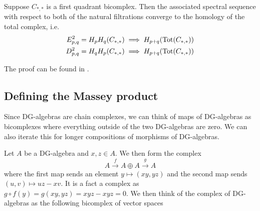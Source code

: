 \begin{lemma}
Suppose $C_{*,*}$ is a first quadrant bicomplex. %
Then the associated spectral sequence with respect to both of the natural filtrations converge to the homology of the total complex, i.e.
\begin{align*}
    E^2_{p,q} = H_p H_q (C_{*,*}) &\implies H_{p+q}(\operatorname{Tot}(C_{*,*})) \\
    D^2_{p,q} = H_q H_p (C_{*,*}) &\implies H_{p+q}(\operatorname{Tot}(C_{*,*}))
\end{align*}
\end{lemma}
The proof can be found in \cite[Theorem 5.5.1]{weibel}. 


\subsection*{Defining the Massey product}

Since DG-algebras are chain complexes, we can think of maps of DG-algebras as bicomplexes where everything outside of the two DG-algebras are zero. We can also iterate this for longer compositions of morphisms of DG-algebras.

Let $A$ be a DG-algebra and $x, z \in A$. We then form the complex
\begin{equation*}
    A\overset{f}\longrightarrow A\oplus A \overset{g}\longrightarrow A
\end{equation*}
where the first map sends an element $y\mapsto (xy, yz)$ and the second map sends $(u, v)\mapsto uz-xv$. It is a fact a complex as $g\circ f (y) = g(xy, yz)= xyz-xyz = 0$. We then think of the complex of DG-algebras as the following bicomplex of vector spaces
\begin{center}
\end{center}

